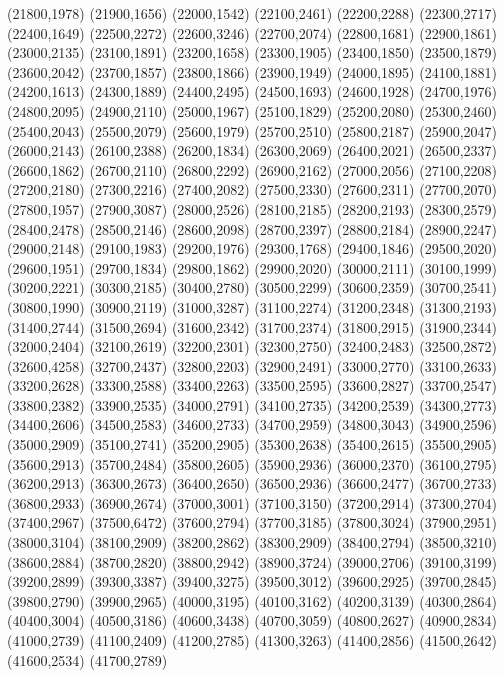 (21800,1978)
(21900,1656)
(22000,1542)
(22100,2461)
(22200,2288)
(22300,2717)
(22400,1649)
(22500,2272)
(22600,3246)
(22700,2074)
(22800,1681)
(22900,1861)
(23000,2135)
(23100,1891)
(23200,1658)
(23300,1905)
(23400,1850)
(23500,1879)
(23600,2042)
(23700,1857)
(23800,1866)
(23900,1949)
(24000,1895)
(24100,1881)
(24200,1613)
(24300,1889)
(24400,2495)
(24500,1693)
(24600,1928)
(24700,1976)
(24800,2095)
(24900,2110)
(25000,1967)
(25100,1829)
(25200,2080)
(25300,2460)
(25400,2043)
(25500,2079)
(25600,1979)
(25700,2510)
(25800,2187)
(25900,2047)
(26000,2143)
(26100,2388)
(26200,1834)
(26300,2069)
(26400,2021)
(26500,2337)
(26600,1862)
(26700,2110)
(26800,2292)
(26900,2162)
(27000,2056)
(27100,2208)
(27200,2180)
(27300,2216)
(27400,2082)
(27500,2330)
(27600,2311)
(27700,2070)
(27800,1957)
(27900,3087)
(28000,2526)
(28100,2185)
(28200,2193)
(28300,2579)
(28400,2478)
(28500,2146)
(28600,2098)
(28700,2397)
(28800,2184)
(28900,2247)
(29000,2148)
(29100,1983)
(29200,1976)
(29300,1768)
(29400,1846)
(29500,2020)
(29600,1951)
(29700,1834)
(29800,1862)
(29900,2020)
(30000,2111)
(30100,1999)
(30200,2221)
(30300,2185)
(30400,2780)
(30500,2299)
(30600,2359)
(30700,2541)
(30800,1990)
(30900,2119)
(31000,3287)
(31100,2274)
(31200,2348)
(31300,2193)
(31400,2744)
(31500,2694)
(31600,2342)
(31700,2374)
(31800,2915)
(31900,2344)
(32000,2404)
(32100,2619)
(32200,2301)
(32300,2750)
(32400,2483)
(32500,2872)
(32600,4258)
(32700,2437)
(32800,2203)
(32900,2491)
(33000,2770)
(33100,2633)
(33200,2628)
(33300,2588)
(33400,2263)
(33500,2595)
(33600,2827)
(33700,2547)
(33800,2382)
(33900,2535)
(34000,2791)
(34100,2735)
(34200,2539)
(34300,2773)
(34400,2606)
(34500,2583)
(34600,2733)
(34700,2959)
(34800,3043)
(34900,2596)
(35000,2909)
(35100,2741)
(35200,2905)
(35300,2638)
(35400,2615)
(35500,2905)
(35600,2913)
(35700,2484)
(35800,2605)
(35900,2936)
(36000,2370)
(36100,2795)
(36200,2913)
(36300,2673)
(36400,2650)
(36500,2936)
(36600,2477)
(36700,2733)
(36800,2933)
(36900,2674)
(37000,3001)
(37100,3150)
(37200,2914)
(37300,2704)
(37400,2967)
(37500,6472)
(37600,2794)
(37700,3185)
(37800,3024)
(37900,2951)
(38000,3104)
(38100,2909)
(38200,2862)
(38300,2909)
(38400,2794)
(38500,3210)
(38600,2884)
(38700,2820)
(38800,2942)
(38900,3724)
(39000,2706)
(39100,3199)
(39200,2899)
(39300,3387)
(39400,3275)
(39500,3012)
(39600,2925)
(39700,2845)
(39800,2790)
(39900,2965)
(40000,3195)
(40100,3162)
(40200,3139)
(40300,2864)
(40400,3004)
(40500,3186)
(40600,3438)
(40700,3059)
(40800,2627)
(40900,2834)
(41000,2739)
(41100,2409)
(41200,2785)
(41300,3263)
(41400,2856)
(41500,2642)
(41600,2534)
(41700,2789)
